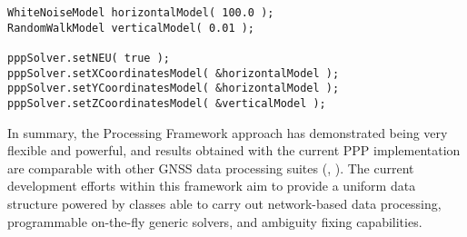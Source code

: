 \begin{scriptsize}
\begin{lstlisting}
WhiteNoiseModel horizontalModel( 100.0 );
RandomWalkModel verticalModel( 0.01 );

pppSolver.setNEU( true );
pppSolver.setXCoordinatesModel( &horizontalModel );
pppSolver.setYCoordinatesModel( &horizontalModel );
pppSolver.setZCoordinatesModel( &verticalModel );
\end{lstlisting}
\end{scriptsize}


In summary, the Processing Framework approach has demonstrated being
very flexible and powerful, and results obtained with the current PPP
implementation are comparable with other GNSS data processing suites
(\cite{esa:navitec2008}, \cite{geomaticweek2009}). The current
development efforts within this framework aim to provide a uniform
data structure powered by classes able to carry out network-based data
processing, programmable on-the-fly generic solvers, and ambiguity
fixing capabilities.


